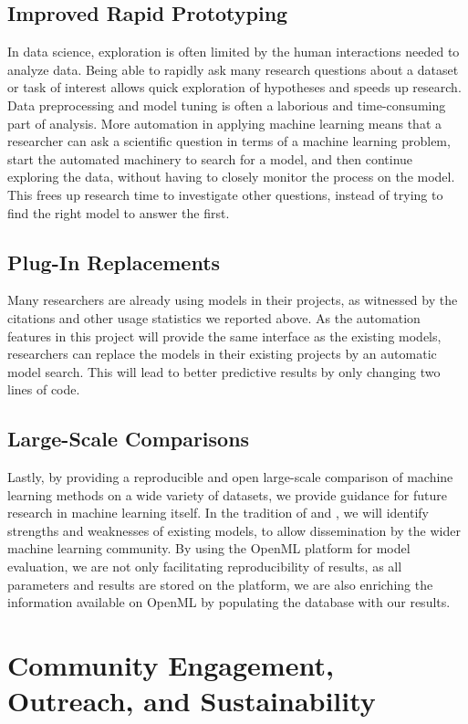 \subsection{Improved Rapid Prototyping}
In data science, exploration is often limited by the human interactions needed to analyze data.
Being able to rapidly ask many research questions about a dataset or task of interest allows
quick exploration of hypotheses and speeds up research.
Data preprocessing and model tuning is often a laborious and time-consuming part of analysis.
More automation in applying machine learning means that a researcher can ask a scientific
question in terms of a machine learning problem, start the automated machinery to
search for a model, and then continue exploring the data, without having to closely monitor
the process on the model. 
This frees up research time to investigate other questions, instead of trying to
find the right model to answer the first.

\subsection{Plug-In Replacements}
Many researchers are already using \sklearn{} models in their projects, as witnessed
by the citations and other usage statistics we reported above. As the automation features
in this project will provide the same interface as the existing models, researchers
can replace the models in their existing projects by an automatic model search.
This will lead to better predictive results by only changing two lines of code.

\subsection{Large-Scale Comparisons}
Lastly, by providing a reproducible and open large-scale comparison of machine learning
methods on a wide variety of datasets, we provide guidance for future research
in machine learning itself.
In the tradition of \textcite{caruana2006empirical} and
\textcite{caruana2008empirical}, we will identify strengths and weaknesses of
existing models, to allow dissemination by the wider machine learning
community. By using the OpenML platform for model evaluation, we are
not only facilitating reproducibility of results, as all parameters and results
are stored on the platform, we are also enriching the information available on OpenML
by populating the database with our results.

\section{Community Engagement, Outreach, and Sustainability}\label{community}
